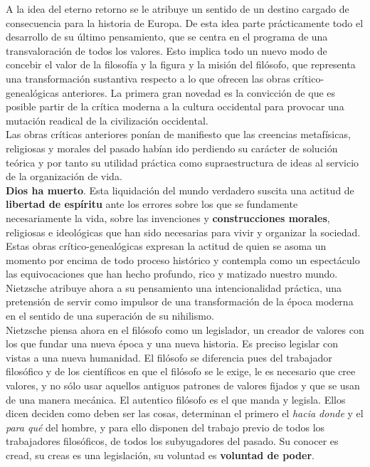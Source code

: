\documentclass[a4paper, 10pt, twocolumn, spanish]{article}
\begin{document}
A la idea del eterno retorno se le atribuye un sentido de un destino
cargado de consecuencia para la historia de Europa. De esta idea parte
prácticamente todo el desarrollo de su último pensamiento, que se
centra en el programa de una transvaloración de todos los
valores. Esto implica todo un nuevo modo de concebir el valor de la
filosofía y la figura y la misión del filósofo, que representa una
transformación sustantiva respecto a lo que ofrecen las obras
crítico-genealógicas anteriores.  La primera gran novedad es la
convicción de que es posible partir de la crítica moderna a la cultura
occidental para provocar una mutación readical de la civilización
occidental.\\[0pt]
Las obras críticas anteriores ponían de manifiesto que las creencias
metafísicas, religiosas y morales del pasado habían ido perdiendo su
carácter de solución teórica y por tanto su utilidad práctica como
supraestructura de ideas al servicio de la organización de vida.\\[0pt]

\textbf{Dios ha muerto}. Esta liquidación del mundo verdadero suscita una
actitud de \textbf{libertad de espíritu} ante los errores sobre los que se
fundamente necesariamente la vida, sobre las invenciones y
\textbf{construcciones morales}, religiosas e ideológicas que han sido
necesarias para vivir y organizar la sociedad.\\[0pt]

Estas obras crítico-genealógicas expresan la actitud de quien se asoma
un momento por encima de todo proceso histórico y contempla como un
espectáculo las equivocaciones que han hecho profundo, rico y matizado
nuestro mundo. Nietzsche atribuye ahora a su pensamiento una
intencionalidad práctica, una pretensión de servir como impulsor de
una transformación de la época moderna en el sentido de una superación
de su nihilismo.\\[0pt]

Nietzsche piensa ahora en el filósofo como un legislador, un creador
de valores con los que fundar una nueva época y una nueva historia. Es
preciso legislar con vistas a una nueva humanidad. El filósofo se
diferencia pues del trabajador filosófico y de los científicos en que
el filósofo se le exige, le es necesario que cree valores, y no sólo
usar aquellos antiguos patrones de valores fijados y que se usan de
una manera mecánica. El autentico filósofo es el que manda y
legisla. Ellos dicen deciden como deben ser las cosas, determinan el
primero el \emph{hacia donde} y el \emph{para qué} del hombre, y para ello
disponen del trabajo previo de todos los trabajadores filosóficos, de
todos los subyugadores del pasado. Su conocer es cread, su creas es
una legislación, su voluntad es \textbf{voluntad de poder}.\\[0pt]
\end{document}
